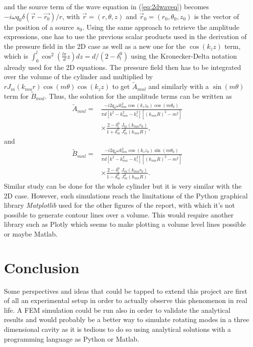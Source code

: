 \documentclass[%
 reprint,
 amsmath,amssymb,
 aps,
]{revtex4-2}
\begin{document}
and the source term of the wave equation in (\ref{eq:2dwaveq}) becomes $-i\omega q_0 \delta(\vec{r} - \vec{r_0})/r$, with $\vec{r} = (r, \theta, z)$ and $\vec{r}_0 = (r_0, \theta_0, z_0)$ is the vector of the position of a source $s_0$. Using the same approach to retrieve the amplitude expressions, one has to use the previous scalar products used in the derivation of the pressure field in the 2D case as well as a new one for the $\cos(k_z z)$ term, which is $\int_0^l \cos^2\left( \frac{l \pi}{d}z \right) dz = d/(2 - \delta_l^0)$ using the Kronecker-Delta notation already used for the 2D equations. The pressure field then has to be integrated over the volume of the cylinder and multiplied by $r J_m(k_{mn}r) \cos(m\theta) \cos(k_z z)$ to get $\tilde{A}_{mnl}$ and similarly with a $\sin(m\theta)$ term for $\tilde{B}_{mnl}$. Thus, the solution for the amplitude terms can be written as 
\begin{equation}
    \begin{split}
        \tilde{A}_{mnl} = &\frac{- i 2 q_0 \omega k^2_{mn} \cos(k_z z_0) \cos(m \theta_0)}{\pi d\left[k^2 - k^2_{mn} - k^2_z \right] \left[(k_{mn}R)^2 - m^2 \right]}\\  &\times \frac{2 - \delta_l^0}{1 + \delta_m^0} \frac{J_m(k_{mn}r_0)}{J^2_{m}(k_{mn}R)},
    \end{split}
\end{equation}
and
\begin{equation}
    \begin{split}
        \tilde{B}_{mnl} = &\frac{- i 2 q_0 \omega k^2_{mn} \cos(k_z z_0) \sin(m \theta_0)}{\pi d\left[k^2 - k^2_{mn} - k^2_z \right] \left[(k_{mn}R)^2 - m^2 \right]}\\  &\times \frac{2 - \delta_l^0}{1 - \delta_m^0} \frac{J_m(k_{mn}r_0)}{J^2_{m}(k_{mn}R)}.
    \end{split}
\end{equation}
Similar study can be done for the whole cylinder but it is very similar with the 2D case. However, such simulations reach the limitations of the Python graphical library \emph{Matplotlib} used for the other figures of the report, with which it's not possible to generate contour lines over a volume. This would require another library such as Plotly which seems to make plotting a volume level lines possible or maybe Matlab.

\section{Conclusion}
Some perspectives and ideas that could be tapped to extend this project are first of all an experimental setup in order to actually observe this phenomenon in real life. A FEM simulation could be run also in order to validate the analytical results and would probably be a better way to simulate rotating modes in a three dimensional cavity as it is tedious to do so using analytical solutions with a programming language as Python or Matlab.
\end{document}
